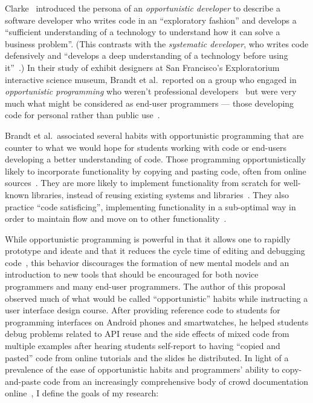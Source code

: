 \documentclass[12pt]{memoir}
\title{}
\author{Andrew Head}
\begin{document}


Clarke~\cite{clarke_what_2007} introduced the persona of an \emph{opportunistic developer} to describe a software developer who writes code in an ``exploratory fashion'' and develops a ``sufficient understanding of a technology to understand how it can solve a business problem''.
(This contrasts with the \emph{systematic developer}, who writes code defensively and ``develops a deep understanding of a technology before using it''~\cite{clarke_what_2007}.)
In their study of exhibit designers at San Francisco's Exploratorium interactive science museum, Brandt et al.\ reported on a group who engaged in \emph{opportunistic programming} who weren't professional developers~\cite{brandt_opportunistic_2008} but were very much what might be considered as end-user programmers --- those developing code for personal rather than public use~\cite{ko_state_2011}.

Brandt et al.\ associated several habits with opportunistic programming that are counter to what we would hope for students working with code or end-users developing a better understanding of code.
Those programming opportunistically likely to incorporate functionality by copying and pasting code, often from online sources~\cite{brandt_two_2009}.
They are more likely to implement functionality from scratch for well-known libraries, instead of reusing existing systems and libraries~\cite{brandt_opportunistic_2008}.
They also practice ``code satisficing'', implementing functionality in a sub-optimal way in order to maintain flow and move on to other functionality~\cite{brandt_opportunistic_2008}.

While opportunistic programming is powerful in that it allows one to rapidly prototype and ideate and that it reduces the cycle time of editing and debugging code~\cite{brandt_opportunistic_2008}, this behavior discourages the formation of new mental models and an introduction to new tools that should be encouraged for both novice programmers and many end-user programmers.
The author of this proposal observed much of what would be called ``opportunistic'' habits while instructing a user interface design course.
After providing reference code to students for programming interfaces on Android phones and smartwatches, he helped students debug problems related to API reuse and the side effects of mixed code from multiple examples after hearing students self-report to having ``copied and pasted'' code from online tutorials and the slides he distributed.
In light of a prevalence of the ease of opportunistic habits and programmers' ability to copy-and-paste code from an increasingly comprehensive body of crowd documentation online~\cite{parnin_crowd_2012}, I define the goals of my research:
\end{document}
